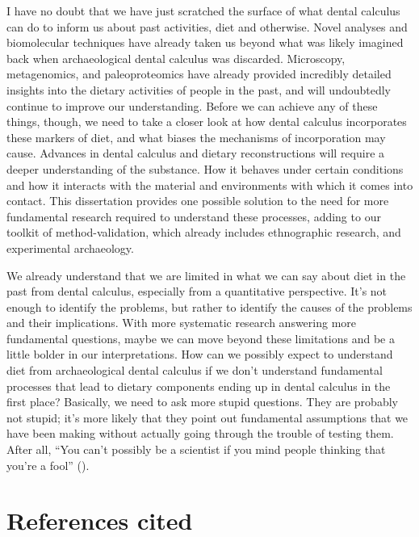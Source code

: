 \documentclass[
  b5paper,
]{book}
\begin{document}
I have no doubt that we have just scratched the surface of what dental
calculus can do to inform us about past activities, diet and otherwise.
Novel analyses and biomolecular techniques have already taken us beyond
what was likely imagined back when archaeological dental calculus was
discarded. Microscopy, metagenomics, and paleoproteomics have already
provided incredibly detailed insights into the dietary activities of
people in the past, and will undoubtedly continue to improve our
understanding. Before we can achieve any of these things, though, we
need to take a closer look at how dental calculus incorporates these
markers of diet, and what biases the mechanisms of incorporation may
cause. Advances in dental calculus and dietary reconstructions will
require a deeper understanding of the substance. How it behaves under
certain conditions and how it interacts with the material and
environments with which it comes into contact. This dissertation
provides one possible solution to the need for more fundamental research
required to understand these processes, adding to our toolkit of
method-validation, which already includes ethnographic research, and
experimental archaeology.

We already understand that we are limited in what we can say about diet
in the past from dental calculus, especially from a quantitative
perspective. It's not enough to identify the problems, but rather to
identify the causes of the problems and their implications. With more
systematic research answering more fundamental questions, maybe we can
move beyond these limitations and be a little bolder in our
interpretations. How can we possibly expect to understand diet from
archaeological dental calculus if we don't understand fundamental
processes that lead to dietary components ending up in dental calculus
in the first place? Basically, we need to ask more stupid questions.
They are probably not stupid; it's more likely that they point out
fundamental assumptions that we have been making without actually going
through the trouble of testing them. After all, ``You can't possibly be
a scientist if you mind people thinking that you're a fool''
().

\section*{References cited}\label{references-cited-5}

\end{document}
